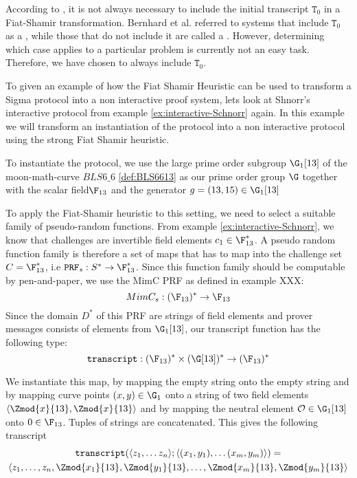 According to \cite{bernhard-16}, it is not always necessary to include the initial transcript $\mathtt{T}_0$ in a Fiat-Shamir transformation. Bernhard et al. referred to systems that include $\mathtt{T}_0$ as a , while those that do not include it are called a . However, determining which case applies to a particular problem is currently not an easy task. Therefore, we have chosen to always include $\mathtt{T}_0$.
\begin{example}
\label{ex:Schnorr-SNARK}
To given an example of how the Fiat Shamir Heuristic can be used to transform a Sigma protocol into a non interactive proof system, lets look at Shnorr's interactive protocol from example  \ref{ex:interactive-Schnorr} again. In this example we will transform an instantiation of the protocol into a non interactive protocol using the strong Fiat Shamir heuristic.  

To instantiate the protocol, we use the large prime order subgroup $\G_1[13]$ of the moon-math-curve $BLS6\_6$ \ref{def:BLS6613} as our prime order group $\G$ together with the scalar field$\F_{13}$ and the generator $g=(13,15)\in \G_1[13]$

To apply the Fiat-Shamir heuristic to this setting, we need to select a suitable family of pseudo-random functions. From example \ref{ex:interactive-Schnorr}, we know that challenges are invertible field elements $c_1\in \F_{13}^*$. A pseudo random function family is therefore a set of maps that has to map into the challenge set $C= \F_{13}^*$, i.e $\mathtt{PRF}_s : S^* \to \F_{13}^*$. Since this function family should be computable by pen-and-paper, we use the MimC PRF as defined in example XXX:
$$
MimC_s : (\F_{13})^* \to \F_{13}
$$
Since the domain $D^*$ of this PRF are strings of field elements and prover messages consists of elements from $\G_1[13]$, our transcript function has the following type:
$$
\mathtt{transcript}: (\F_{13})^* \times (\G[13])^* \to (\F_{13})^*
$$
 
We instantiate this map, by mapping the empty string onto the empty string and by mapping curve points $(x,y)\in \G_1$ onto a string of two field elements $\langle \Zmod{x}{13},\Zmod{x}{13}\rangle$ and by mapping the neutral element $\mathcal{O}\in \G_1[13]$ onto $0\in \F_{13}$. Tuples of strings are concatenated. This gives the following transcript
\begin{multline*}
\mathtt{transcript}(\langle z_1,\ldots z_n\rangle; \langle(x_1,y_1),\ldots (x_m,y_m)\rangle)= \\
\langle z_1,\ldots, z_n, \Zmod{x_1}{13}, \Zmod{y_1}{13},\ldots, \Zmod{x_m}{13},\Zmod{y_m}{13} \rangle   
\end{multline*}


\end{example}
